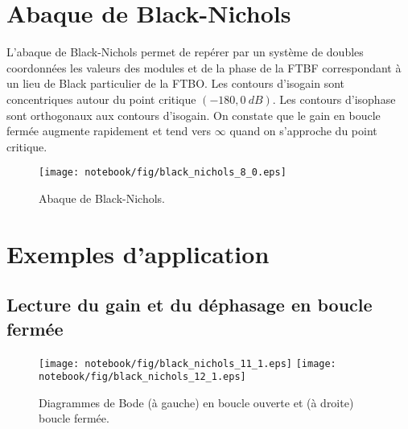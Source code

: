 \section{Abaque de Black-Nichols}
L'abaque de Black-Nichols permet de repérer par un système de doubles 
coordonnées les valeurs des modules et de la phase de la FTBF correspondant à 
un lieu de Black particulier de la FTBO. Les contours d'isogain sont 
concentriques autour du point critique $(-180,\SI{0}{dB})$. Les contours 
d'isophase sont orthogonaux aux contours d'isogain.
On constate que le gain en boucle fermée augmente rapidement et tend vers 
$\infty$ quand on s'approche du point critique.
\begin{figure}[!h]
\begin{center}
    \texttt{[image: notebook/fig/black\_nichols\_8\_0.eps]}
\end{center}
    \caption{Abaque de Black-Nichols.}
\end{figure}
\clearpage
\section{Exemples d'application}\label{exemples-dapplication}

\subsection{Lecture du gain et du déphasage en boucle fermée}
\begin{figure}[!h]
\begin{center}
    \texttt{[image: notebook/fig/black\_nichols\_11\_1.eps]}
    \texttt{[image: notebook/fig/black\_nichols\_12\_1.eps]}
\end{center}
    \caption{Diagrammes de Bode (à gauche) en boucle ouverte et (à droite) 
    boucle fermée.}
\end{figure}


